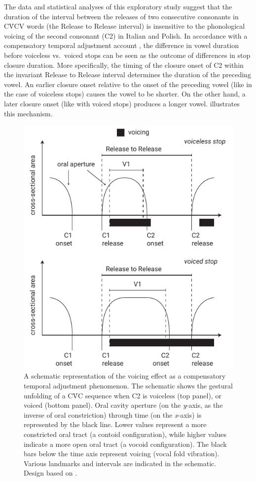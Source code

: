 \documentclass[preprint]{JASAnew}
\begin{document}
The data and statistical analyses of this exploratory study suggest that
the duration of the interval between the releases of two consecutive
consonants in CV́CV words (the Release to Release interval) is
insensitive to the phonological voicing of the second consonant (C2) in
Italian and Polish. In accordance with a compensatory temporal
adjustment account \citep{slis1969, lehiste1970}, the difference in
vowel duration before voiceless vs.~voiced stops can be seen as the
outcome of differences in stop closure duration. More specifically, the
timing of the closure onset of C2 within the invariant Release to
Release interval determines the duration of the preceding vowel. An
earlier closure onset relative to the onset of the preceding vowel (like
in the case of voiceless stops) causes the vowel to be shorter. On the
other hand, a later closure onset (like with voiced stops) produces a
longer vowel.  illustrates this mechanism.

\begin{figure}
  \includegraphics{img/compensatory.pdf}
  \caption{A schematic representation of the voicing effect as a compensatory temporal adjustment phenomenon. The schematic shows the gestural unfolding of a CV́C sequence when C2 is voiceless (top panel), or voiced (bottom panel). Oral cavity aperture (on the \textit{y}-axis, as the inverse of oral constriction) through time (on the \textit{x}-axis) is represented by the black line. Lower values represent a more constricted oral tract (a contoid configuration), while higher values indicate a more open oral tract (a vocoid configuration). The black bars below the time axis represent voicing (vocal fold vibration). Various landmarks and intervals are indicated in the schematic. Design based on \citet{esposito2002}.}
  \label{f:compensatory}
\end{figure}
\end{document}
